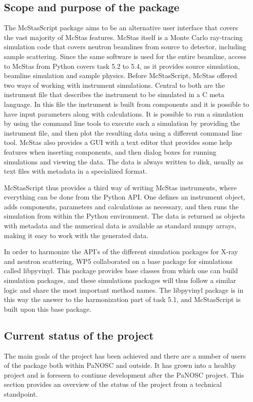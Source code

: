 \documentclass[11pt, a4paper]{article}
\begin{document}
\subsection{Scope and purpose of the package}
The McStasScript package aims to be an alternative user interface that covers the vast majority of McStas features. McStas itself is a Monte Carlo ray-tracing simulation code that covers neutron beamlines from source to detector, including sample scattering. Since the same software is used for the entire beamline, access to McStas from Python covers task 5.2 to 5.4, as it provides source simulation, beamline simulation and sample physics. Before McStasScript, McStas offered two ways of working with instrument simulations. Central to both are the instrument file that describes the instrument to be simulated in a C meta language. In this file the instrument is built from components and it is possible to have input parameters along with calculations. It is possible to run a simulation by using the command line tools to execute such a simulation by providing the instrument file, and then plot the resulting data using a different command line tool. McStas also provides a GUI with a text editor that provides some help features when inserting components, and then dialog boxes for running simulations and viewing the data. The data is always written to disk, usually as text files with metadata in a specialized format.

McStasScript thus provides a third way of writing McStas instruments, where everything can be done from the Python API. One defines an instrument object, adds components, parameters and calculations as necessary, and then runs the simulation from within the Python environment. The data is returned as objects with metadata and the numerical data is available as standard numpy arrays, making it easy to work with the generated data.

In order to harmonize the API's of the different simulation packages for X-ray and neutron scattering, WP5 collaborated on a base package for simulations called libpyvinyl. This package provides base classes from which one can build simulation packages, and these simulations packages will thus follow a similar logic and share the most important method names. The libpyvinyl package is in this way the answer to the harmonization part of task 5.1, and McStasScript is built upon this base package.

\subsection{Current status of the project}
The main goals of the project has been achieved and there are a number of users of the package both within PaNOSC and outside. It has grown into a healthy project and is foreseen to continue development after the PaNOSC project. This section provides an overview of the status of the project from a technical standpoint.
\end{document}
